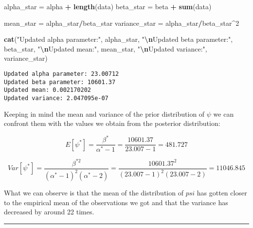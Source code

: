 \documentclass[
]{article}
\newenvironment{Shaded}{\begin{snugshade}}{\end{snugshade}}
\newcommand{\DecValTok}[1]{\textcolor[rgb]{0.00,0.00,0.81}{#1}}
\newcommand{\FunctionTok}[1]{\textcolor[rgb]{0.13,0.29,0.53}{\textbf{#1}}}
\newcommand{\NormalTok}[1]{#1}
\newcommand{\OtherTok}[1]{\textcolor[rgb]{0.56,0.35,0.01}{#1}}
\newcommand{\SpecialCharTok}[1]{\textcolor[rgb]{0.81,0.36,0.00}{\textbf{#1}}}
\newcommand{\StringTok}[1]{\textcolor[rgb]{0.31,0.60,0.02}{#1}}
\begin{document}
\begin{Shaded}
\begin{Highlighting}[]
\NormalTok{alpha\_star }\OtherTok{=}\NormalTok{ alpha }\SpecialCharTok{+} \FunctionTok{length}\NormalTok{(data)}
\NormalTok{beta\_star }\OtherTok{=}\NormalTok{ beta }\SpecialCharTok{+} \FunctionTok{sum}\NormalTok{(data)}

\NormalTok{mean\_star }\OtherTok{=}\NormalTok{ alpha\_star}\SpecialCharTok{/}\NormalTok{beta\_star}
\NormalTok{variance\_star }\OtherTok{=}\NormalTok{ alpha\_star}\SpecialCharTok{/}\NormalTok{beta\_star}\SpecialCharTok{\^{}}\DecValTok{2}

\FunctionTok{cat}\NormalTok{(}\StringTok{"Updated alpha parameter:"}\NormalTok{, alpha\_star, }\StringTok{"}\SpecialCharTok{\textbackslash{}n}\StringTok{Updated beta parameter:"}\NormalTok{,}
\NormalTok{    beta\_star, }\StringTok{"}\SpecialCharTok{\textbackslash{}n}\StringTok{Updated mean:"}\NormalTok{, mean\_star, }\StringTok{"}\SpecialCharTok{\textbackslash{}n}\StringTok{Updated variance:"}\NormalTok{,}
\NormalTok{    variance\_star)}
\end{Highlighting}
\end{Shaded}

\begin{verbatim}
Updated alpha parameter: 23.00712 
Updated beta parameter: 10601.37 
Updated mean: 0.002170202 
Updated variance: 2.047095e-07
\end{verbatim}

Keeping in mind the mean and variance of the prior distribution of
\(\psi\) we can confront them with the values we obtain from the
posterior distribution:

\[
E[\psi^*] = \frac{\beta^*}{\alpha^* - 1} = \frac{10601.37}{23.007 - 1} = 481.727
\]

\[
Var[\psi^*] = \frac{\beta^{*2}}{(\alpha^* - 1)^2(\alpha^* - 2)} = \frac{10601.37^2}{(23.007 - 1)^2(23.007 - 2)} = 11046.845
\]

What we can observe is that the mean of the distribution of \(psi\) has
gotten closer to the empirical mean of the observations we got and that
the variance has decreased by around 22 times.

\begin{center}\rule{0.5\linewidth}{0.5pt}\end{center}
\end{document}
